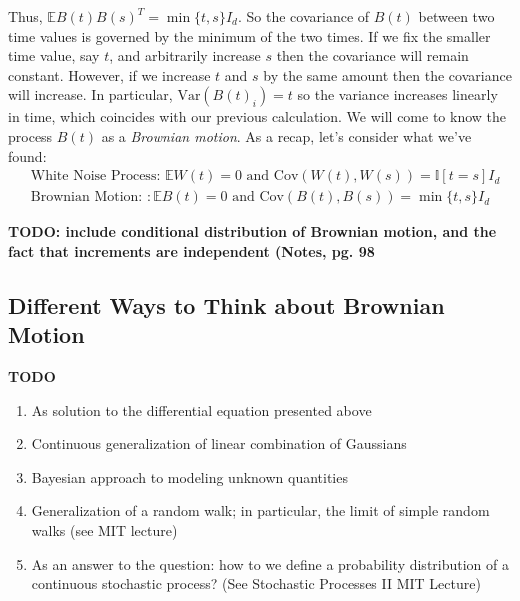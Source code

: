 \documentclass[12pt]{article}
\newcommand{\E}{\mathbb{E}}
\newcommand{\Var}{\mathrm{Var}}
\newcommand{\Cov}{\mathrm{Cov}}
\begin{document}
Thus, $\E B(t)B(s)^T = \min\{t, s\} I_d$. So the covariance of $B(t)$ between two time values is governed by the minimum of the two times. If we fix the smaller time 
value, say $t$, and arbitrarily increase $s$ then the covariance will remain constant. However, if we increase $t$ and $s$ by the same amount then the covariance 
will increase. In particular, $\Var(B(t)_i) = t$ so the variance increases linearly in time, which coincides with our previous calculation. We will come to know the process $B(t)$ as a \textit{Brownian motion}. As a recap, let's consider what we've found: 
\begin{align*}
&\text{White Noise Process: } \E W(t) = 0 \text{ and } \Cov(W(t), W(s)) = \mathbb{I}[t = s]I_d \\
&\text{Brownian Motion: }: \E B(t) = 0 \text{ and } \Cov(B(t), B(s)) =  \min\{t, s\} I_d
\end{align*}

\textbf{TODO: include conditional distribution of Brownian motion, and the fact that increments are independent (Notes, pg. 98}

\subsection{Different Ways to Think about Brownian Motion}
\textbf{TODO}
\begin{enumerate}
\item As solution to the differential equation presented above 
\item Continuous generalization of linear combination of Gaussians
\item Bayesian approach to modeling unknown quantities 
\item Generalization of a random walk; in particular, the limit of simple random walks (see MIT lecture)
\item As an answer to the question: how to we define a probability distribution of a continuous stochastic process? (See Stochastic Processes II MIT Lecture)
\end{enumerate}
\end{document}
